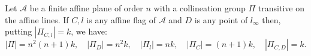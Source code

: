 Let $\mathcal{A}$ be a finite affine plane of order $n$ with a collineation group $\Pi$ transitive on the affine lines. If $C, l$ is any affine flag of $\mathcal{A}$ and $D$ is any point of $l_\infty$ then, putting $|\Pi_{C, l}| = k$, we have:
$$|\Pi| = n^2(n+1)k,\quad |\Pi_D| = n^2k,\quad |\Pi_l| = nk,\quad |\Pi_C| = (n+1)k,\quad |\Pi_{C, D}| = k.$$
